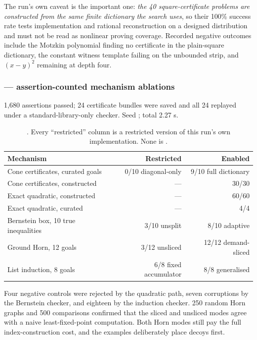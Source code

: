The run's own caveat is the important one: \emph{the 40 square-certificate
problems are constructed from the same finite dictionary the search uses}, so
their 100\% success rate tests implementation and rational reconstruction on a
designed distribution and must not be read as nonlinear proving coverage.
Recorded negative outcomes include the Motzkin polynomial finding no certificate
in the plain-square dictionary, the constant witness template failing on the
unbounded strip, and $(x-y)^2$ remaining \unknown{} at depth four.

\subsubsection*{ --- assertion-counted mechanism ablations}

1{,}680 assertions passed; 24 certificate bundles were saved and all 24 replayed
under a standard-library-only checker. Seed ; total 2.27 s.

\begin{table}[htbp]
\centering\small
\begin{tabular}{@{}lrr@{}}
\toprule
Mechanism & Restricted & Enabled \\
\midrule
Cone certificates, curated goals & 0/10 diagonal-only & 9/10 full dictionary \\
Cone certificates, constructed & --- & 30/30 \\
Exact quadratic, constructed & --- & 60/60 \\
Exact quadratic, curated & --- & 4/4 \\
Bernstein box, 10 true inequalities & 3/10 unsplit & 8/10 adaptive \\
Ground Horn, 12 goals & 3/12 unsliced & 12/12 demand-sliced \\
List induction, 8 goals & 6/8 fixed accumulator & 8/8 generalised \\
\bottomrule
\end{tabular}
\caption{. Every ``restricted'' column is a restricted version of this
run's own implementation. None is \grind{}.}
\label{tab:p3}
\end{table}

Four negative controls were rejected by the quadratic path, seven corruptions by
the Bernstein checker, and eighteen by the induction checker. 250 random Horn
graphs and 500 comparisons confirmed that the sliced and unsliced modes agree
with a naive least-fixed-point computation. Both Horn modes still pay the full
index-construction cost, and the examples deliberately place decoys first.


